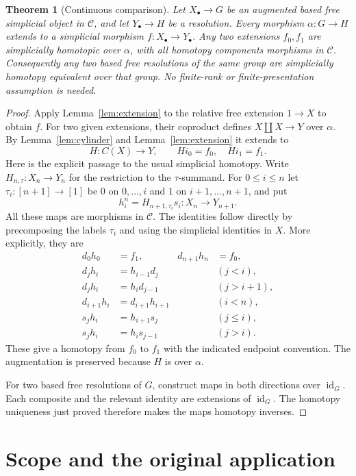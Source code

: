\documentclass[11pt,a4paper]{article}
\newtheorem{theorem}{Theorem}[section]
\theoremstyle{definition}
\newcommand{\C}{\mathcal C}
\newcommand{\id}{\operatorname{id}}
\begin{document}
\begin{theorem}[Continuous comparison]\label{thm:comparison}
Let $X_\bullet\to G$ be an augmented based free simplicial object
in $\C$, and let $Y_\bullet\to H$ be a resolution. Every morphism
$\alpha:G\to H$ extends to a simplicial morphism
$f:X_\bullet\to Y_\bullet$. Any two extensions $f_0,f_1$ are
simplicially homotopic over $\alpha$, with all homotopy components
morphisms in $\C$.
Consequently any two based free resolutions of the same group are
simplicially homotopy equivalent over that group. No finite-rank or
finite-presentation assumption is needed.
\end{theorem}
\begin{proof}
Apply Lemma~\ref{lem:extension} to the relative free extension
$1\to X$ to obtain $f$. For two given extensions, their coproduct
defines $X\amalg X\to Y$ over $\alpha$. By
Lemma~\ref{lem:cylinder} and Lemma~\ref{lem:extension} it extends to
\[
 H:C(X)\longrightarrow Y,\qquad H i_0=f_0,\quad H i_1=f_1.
\]
Here is the explicit passage to the usual simplicial homotopy.
Write $H_{n,\tau}:X_n\to Y_n$ for the restriction to the
$\tau$-summand. For $0\leq i\leq n$ let
$\tau_i:[n+1]\to[1]$ be $0$ on $0,\ldots,i$ and $1$ on
$i+1,\ldots,n+1$, and put
\[
 h_i^n=H_{n+1,\tau_i}s_i:X_n\longrightarrow Y_{n+1}.
\]
All these maps are morphisms in $\C$. The identities follow directly
by precomposing the labels $\tau_i$ and using the simplicial identities
in $X$. More explicitly, they are
\begin{align*}
 d_0h_0&=f_1,&d_{n+1}h_n&=f_0,\\
 d_jh_i&=h_{i-1}d_j &&(j<i),\\
 d_jh_i&=h_i d_{j-1} &&(j>i+1),\\
 d_{i+1}h_i&=d_{i+1}h_{i+1} &&(i<n),\\
 s_jh_i&=h_{i+1}s_j &&(j\leq i),\\
 s_jh_i&=h_i s_{j-1} &&(j>i).
\end{align*}
These give a homotopy from $f_0$ to $f_1$ with the indicated endpoint
convention. The augmentation is preserved because $H$ is over
$\alpha$.

For two based free resolutions of $G$, construct maps in both
directions over $\id_G$. Each composite and the relevant identity
are extensions of $\id_G$. The homotopy uniqueness just proved
therefore makes the maps homotopy inverses.
\end{proof}

\section{Scope and the original application}
\end{document}
